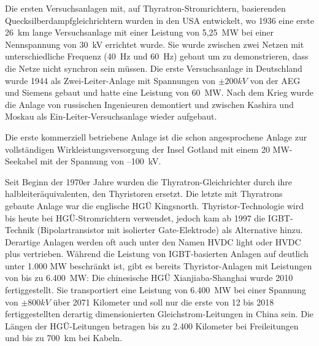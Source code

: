 Die ersten Versuchsanlagen mit, auf Thyratron-Stromrichtern, basierenden Quecksilberdampfgleichrichtern wurden in den USA entwickelt, wo 1936 eine erste 26\ km lange Versuchsanlage mit einer Leistung von 5,25\ MW bei einer Nennspannung von 30\ kV errichtet wurde. Sie wurde zwischen zwei Netzen mit unterschiedliche Frequenz (40\ Hz und 60\ Hz) gebaut um zu demonstrieren, dass die Netze nicht synchron sein müssen. Die erste Versuchsanlage in Deutschland wurde 1944 als Zwei-Leiter-Anlage mit Spannungen von $\pm 200 kV$ von der AEG und Siemens gebaut und hatte eine Leistung von 60\ MW. Nach dem Krieg wurde die Anlage von russischen Ingenieuren demontiert und zwischen Kashira und Moskau als Ein-Leiter-Versuchsanlage wieder aufgebaut.

\newpage

Die erste kommerziell betriebene Anlage ist die schon angesprochene Anlage zur vollständigen Wirkleistungsversorgung der Insel Gotland mit einem 20 MW-Seekabel mit der Spannung von --100\ kV.

Seit Beginn der 1970er Jahre wurden die Thyratron-Gleichrichter durch ihre halbleiteräquivalenten, den Thyristoren ersetzt. Die letzte mit Thyratrons gebaute Anlage war die englische HGÜ Kingsnorth. Thyristor-Technologie wird bis heute bei HGÜ-Stromrichtern verwendet, jedoch kam ab 1997 die IGBT-Technik (Bipolartransistor mit isolierter Gate-Elektrode) als Alternative hinzu. Derartige Anlagen werden oft auch unter den Namen HVDC light oder HVDC plus vertrieben.
Während die Leistung von IGBT-basierten Anlagen auf deutlich unter 1.000 MW beschränkt ist, gibt es bereits Thyristor-Anlagen mit Leistungen von bis zu 6.400\ MW:
Die chinesische HGÜ Xianjiaba-Shanghai wurde 2010 fertiggestellt.\cite{Kao}
Sie transportiert eine Leistung von 6.400\ MW bei einer Spannung von $\pm800 kV$ über 2071 Kilometer und
soll nur die erste von 12 bis 2018 fertiggestellten derartig dimensionierten Gleichstrom-Leitungen in China sein.\cite{Liste}
Die Längen der HGÜ-Leitungen betragen bis zu 2.400 Kilometer bei Freileitungen und bis zu 700\ km bei Kabeln.\cite{Liste} 

